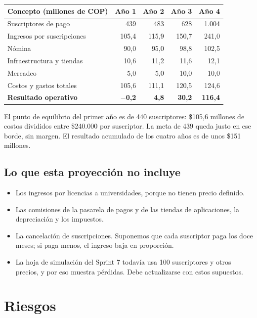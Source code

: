 \documentclass[11pt,a4paper]{article}
\begin{document}
\begin{tabularx}{\textwidth}{X r r r r}
  \toprule
  \textbf{Concepto (millones de COP)} & \textbf{Año 1} & \textbf{Año 2} & \textbf{Año 3} & \textbf{Año 4} \\
  \midrule
  Suscriptores de pago & 439 & 483 & 628 & 1.004 \\
  Ingresos por suscripciones & 105,4 & 115,9 & 150,7 & 241,0 \\
  Nómina & 90,0 & 95,0 & 98,8 & 102,5 \\
  Infraestructura y tiendas & 10,6 & 11,2 & 11,6 & 12,1 \\
  Mercadeo & 5,0 & 5,0 & 10,0 & 10,0 \\
  Costos y gastos totales & 105,6 & 111,1 & 120,5 & 124,6 \\
  \textbf{Resultado operativo} & \textbf{$-$0,2} & \textbf{4,8} & \textbf{30,2} & \textbf{116,4} \\
  \bottomrule
\end{tabularx}

El punto de equilibrio del primer año es de 440 suscriptores: \$105,6 millones de costos divididos entre \$240.000 por suscriptor. La meta de 439 queda justo en ese borde, sin margen. El resultado acumulado de los cuatro años es de unos \$151 millones.

\subsection{Lo que esta proyección no incluye}

\begin{itemize}[leftmargin=1.5em]
  \item Los ingresos por licencias a universidades, porque no tienen precio definido.
  \item Las comisiones de la pasarela de pagos y de las tiendas de aplicaciones, la depreciación y los impuestos.
  \item La cancelación de suscripciones. Suponemos que cada suscriptor paga los doce meses; si paga menos, el ingreso baja en proporción.
  \item La hoja de simulación del Sprint 7 todavía usa 100 suscriptores y otros precios, y por eso muestra pérdidas. Debe actualizarse con estos supuestos.
\end{itemize}

\section{Riesgos}
\end{document}
